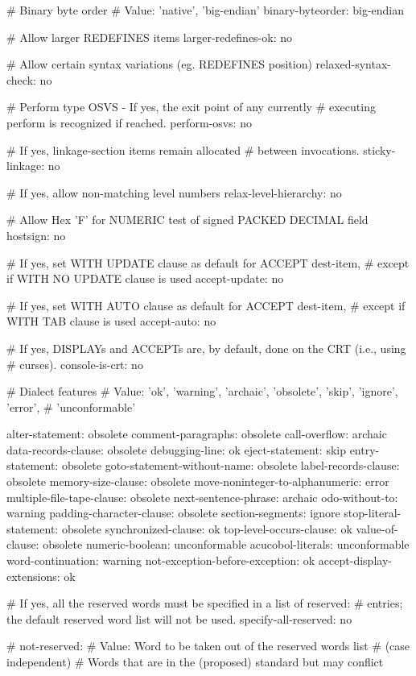 # Binary byte order
# Value: 'native', 'big-endian'
binary-byteorder:		big-endian

# Allow larger REDEFINES items
larger-redefines-ok:		no

# Allow certain syntax variations (eg. REDEFINES position)
relaxed-syntax-check:		no

# Perform type OSVS - If yes, the exit point of any currently
# executing perform is recognized if reached.
perform-osvs:			no

# If yes, linkage-section items remain allocated
# between invocations.
sticky-linkage:			no

# If yes, allow non-matching level numbers
relax-level-hierarchy:		no

# Allow Hex 'F' for NUMERIC test of signed PACKED DECIMAL field
hostsign:			no

# If yes, set WITH UPDATE clause as default for ACCEPT dest-item,
# except if WITH NO UPDATE clause is used
accept-update:			no

# If yes, set WITH AUTO clause as default for ACCEPT dest-item,
# except if WITH TAB clause is used
accept-auto:			no

# If yes, DISPLAYs and ACCEPTs are, by default, done on the CRT (i.e., using
# curses).
console-is-crt:			no

# Dialect features
# Value: 'ok', 'warning', 'archaic', 'obsolete', 'skip', 'ignore', 'error',
#        'unconformable'

alter-statement:			obsolete
comment-paragraphs:			obsolete
call-overflow:				archaic
data-records-clause:			obsolete
debugging-line:				ok
eject-statement:			skip
entry-statement:			obsolete
goto-statement-without-name:		obsolete
label-records-clause:			obsolete
memory-size-clause:			obsolete
move-noninteger-to-alphanumeric:	error
multiple-file-tape-clause:		obsolete
next-sentence-phrase:			archaic
odo-without-to:				warning
padding-character-clause:		obsolete
section-segments:			ignore
stop-literal-statement:			obsolete
synchronized-clause:			ok
top-level-occurs-clause:		ok
value-of-clause:			obsolete
numeric-boolean:			unconformable
acucobol-literals:			unconformable
word-continuation:			warning
not-exception-before-exception:		ok
accept-display-extensions:		ok

# If yes, all the reserved words must be specified in a list of reserved:
# entries; the default reserved word list will not be used.
specify-all-reserved: no

# not-reserved:
# Value: Word to be taken out of the reserved words list
# (case independent)
# Words that are in the (proposed) standard but may conflict

